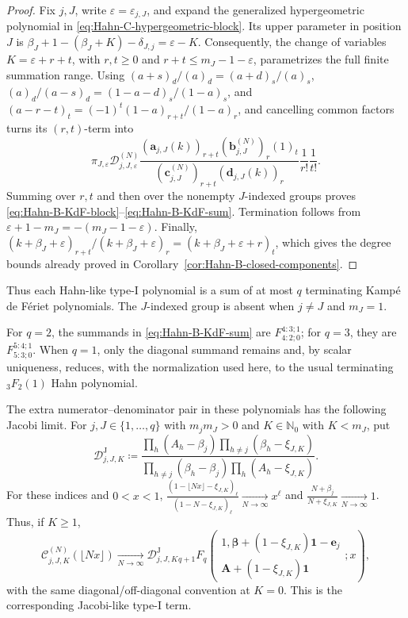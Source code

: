 \documentclass[10pt]{amsart}
\newcommand{\Nzero}{\mathbb N_0}
\newcommand{\one}{\boldsymbol 1}
\newcommand{\A}{\boldsymbol A}
\newcommand{\bbeta}{\boldsymbol\beta}
\newcommand{\ee}{\boldsymbol e}
\newcommand{\pFq}[5]{{}_{#1}F_{#2}\!\left(\begin{matrix}#3\\#4\end{matrix};#5\right)}
\theoremstyle{plain}
\theoremstyle{definition}
\theoremstyle{remark}
\begin{document}
\begin{proof}
Fix \(j,J\), write \(\varepsilon=\varepsilon_{j,J}\), and expand the
generalized hypergeometric polynomial in
\eqref{eq:Hahn-C-hypergeometric-block}. Its upper parameter in position
\(J\) is
\(\beta_J+1-(\beta_J+K)-\delta_{J,j}=\varepsilon-K\).
Consequently, the change of variables \(K=\varepsilon+r+t\), with
\(r,t\ge0\) and \(r+t\le m_J-1-\varepsilon\),
parametrizes the full finite summation range. Using
\((a+s)_d/(a)_d=(a+d)_s/(a)_s\),
\((a)_d/(a-s)_d=(1-a-d)_s/(1-a)_s\), and
\((a-r-t)_t=(-1)^t(1-a)_{r+t}/(1-a)_r\), and cancelling common factors
turns its \((r,t)\)-term into
\[
 \pi_{J,\varepsilon}\mathcal D_{j,J,\varepsilon}^{(N)}
 \frac{(\boldsymbol a_{j,J}(k))_{r+t}
       (\boldsymbol b_{j,J}^{(N)})_r(1)_t}
      {(\boldsymbol c_{j,J}^{(N)})_{r+t}
       (\boldsymbol d_{j,J}(k))_r}
 \frac1{r!}\frac1{t!}.
\]
Summing over \(r,t\) and then over the nonempty \(J\)-indexed groups proves
\eqref{eq:Hahn-B-KdF-block}--\eqref{eq:Hahn-B-KdF-sum}. Termination follows
from \(\varepsilon+1-m_J=-(m_J-1-\varepsilon)\). Finally,
\((k+\beta_J+\varepsilon)_{r+t}/
(k+\beta_J+\varepsilon)_r=(k+\beta_J+\varepsilon+r)_t\), which gives the
degree bounds already proved in
Corollary~\ref{cor:Hahn-B-closed-components}.
\end{proof}

Thus each Hahn-like type-I polynomial is a sum of at most \(q\)
terminating Kamp\'e de F\'eriet polynomials. The \(J\)-indexed group is
absent when \(j\ne J\) and \(m_J=1\).

For \(q=2\), the summands in \eqref{eq:Hahn-B-KdF-sum} are
\(F_{4:2;0}^{4:3;1}\); for \(q=3\), they are
\(F_{5:3;0}^{5:4;1}\). When \(q=1\), only the diagonal summand remains and,
by scalar uniqueness, reduces, with the normalization used here, to the usual
terminating \({}_3F_2(1)\) Hahn polynomial.

The extra numerator--denominator pair in these polynomials has the following
Jacobi limit. For \(j,J\in\{1,\ldots,q\}\) with \(m_jm_J>0\) and
\(K\in\Nzero\) with \(K<m_J\), put
\[
 \mathcal D_{j,J,K}^{\mathrm J}\coloneq
 \frac{\prod_h(A_h-\beta_j)\prod_{h\ne j}(\beta_h-\xi_{J,K})}
 {\prod_{h\ne j}(\beta_h-\beta_j)\prod_h(A_h-\xi_{J,K})}.
\]
For these indices and \(0<x<1\),
\(\frac{(1-\lfloor Nx\rfloor-\xi_{J,K})_\ell}
{(1-N-\xi_{J,K})_\ell}\xrightarrow[N\to\infty]{} x^\ell\) and
\(\frac{N+\beta_j}{N+\xi_{J,K}}\xrightarrow[N\to\infty]{}1\).
Thus, if \(K\ge1\),
\[
 \mathcal C_{j,J,K}^{(N)}(\lfloor Nx\rfloor)
 \xrightarrow[N\to\infty]{}
 \mathcal D_{j,J,K}^{\mathrm J}
 \pFq{q+1}{q}
 {1,\bbeta+(1-\xi_{J,K})\one-\ee_j}
 {\A+(1-\xi_{J,K})\one}{x},
\]
with the same diagonal/off-diagonal convention at \(K=0\). This is the
corresponding Jacobi-like type-I term.
\end{document}
